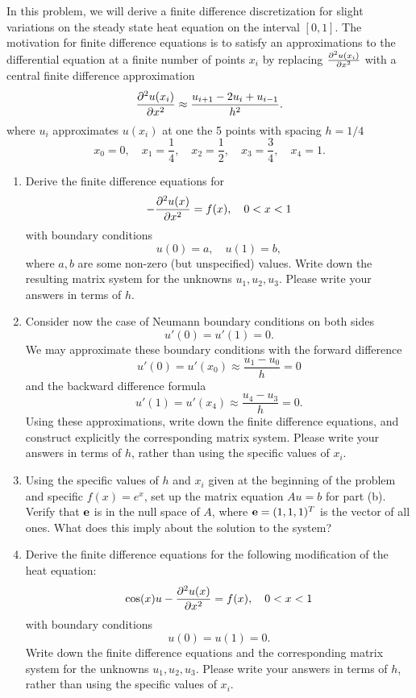 
In this problem, we will derive a finite difference discretization for slight variations on the steady state heat equation on the interval $[0,1]$.  The motivation for finite difference equations is to satisfy an approximations to the differential equation at a finite number of points $x_i$ by replacing $\frac{\partial^{2} u(x_i)}{\partial x^{2}}$ with a central finite difference approximation
\[
\frac{\partial^{2} u(x_i)}{\partial x^{2}} \approx \frac{ u_{i+1} - 2u_i + u_{i-1}}{h^2}.
\]
where $u_i$ approximates $u(x_i)$ at one the 5 points with spacing $h = 1/4$
\[
x_0 = 0, \quad x_1 = \frac{1}{4}, \quad x_2 = \frac{1}{2}, \quad x_3 = \frac{3}{4}, \quad x_4 = 1.
\]
\begin{enumerate}
\item Derive the finite difference equations for 
\[
- \frac{\partial^{2} u(x)}{\partial x^{2}} = f(x), \quad 0<x<1
\]
with boundary conditions 
\[
u(0) = a, \quad u(1) = b,
\]
where $a, b$ are some non-zero (but unspecified) values.  Write down the resulting matrix system for the unknowns $u_1, u_2, u_3$.  Please write your answers in terms of $h$.
\vspace{1em}
\item Consider now the case of Neumann boundary conditions on both sides
\[
u'(0) = u'(1) = 0.
\]
We may approximate these boundary conditions with the forward difference
\[
u'(0) = u'(x_0) \approx \frac{u_1-u_0}{h} = 0
\]
and the backward difference formula
\[
u'(1) = u'(x_{4}) \approx \frac{u_{4}-u_3}{h} = 0.
\]
Using these approximations, write down the finite difference equations, and construct explicitly the corresponding matrix system.  Please write your answers in terms of $h$, rather than using the specific values of $x_i$.
\item Using the specific values of $h$ and $x_i$ given at the beginning of the problem and specific $f(x) = e^x$, set up the matrix equation $Au=b$ for part (b).  Verify that ${\bf e}$ is in the null space of ${A}$, where ${\bf e} = (1,1,1)^T$ is the vector of all ones.  What does this imply about the solution to the system?  
\vspace{1em}
\item Derive the finite difference equations for the following modification of the heat equation:
\[
\cos(x) u - \frac{\partial^{2} u(x)}{\partial x^{2}} = f(x), \quad 0<x<1
\]
with boundary conditions 
\[
u(0) = u(1) = 0.
\]
Write down the finite difference equations and the corresponding matrix system for the unknowns $u_1, u_2, u_3$.  Please write your answers in terms of $h$, rather than using the specific values of $x_i$.


\end{enumerate}


